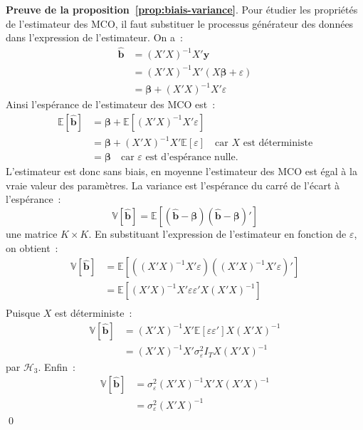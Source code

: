 \documentclass[10pt]{beamer}
\begin{document}
\begin{notes}

  \textbf{Preuve de la proposition~\ref{prop:biais-variance}}. Pour étudier les propriétés de l'estimateur des MCO, il faut substituer le processus générateur des données dans l'expression de l'estimateur. On a~:
  \[
    \begin{split}
      \hat{\mathbf b} &= (X'X)^{-1}X'\mathbf y\\
                      &= (X'X)^{-1}X'\left( X\bm \beta + \varepsilon \right)\\
                      &= \bm \beta + (X'X)^{-1}X'\varepsilon
    \end{split}
  \]
  Ainsi l'espérance de l'estimateur des MCO est~:
  \[
    \begin{split}
      \mathbb E \left[ \hat{\mathbf b} \right] &= \bm \beta + \mathbb E\left[ (X'X)^{-1}X'\varepsilon \right]\\
                                               &= \bm \beta + (X'X)^{-1}X'\mathbb E\left[ \varepsilon \right]\quad\text{car $X$ est déterministe}\\
                                               &= \bm \beta\quad\text{car $\varepsilon$  est d'espérance nulle.}
    \end{split}
  \]
  L'estimateur est donc sans biais, en moyenne l'estimateur des MCO est égal à la vraie valeur des paramètres. La variance est l'espérance du carré de l'écart à l'espérance~:
  \[
    \mathbb V\left[ \hat{\mathbf b} \right] = \mathbb E\left[\left( \hat{\mathbf b}- \bm\beta \right)\left( \hat{\mathbf b}- \bm\beta \right)'\right]
  \]
  une matrice $K\times K$. En substituant l'expression de l'estimateur en fonction de $\varepsilon$, on obtient~:
\[
    \begin{split}
      \mathbb V\left[ \hat{\mathbf b} \right] &= \mathbb E\left[ \left( (X'X)^{-1}X'\varepsilon \right)\left( (X'X)^{-1}X'\varepsilon \right)' \right]\\
                                              &= \mathbb E\left[ (X'X)^{-1}X'\varepsilon\varepsilon' X (X'X)^{-1} \right]\\
    \end{split}
  \]
Puisque $X$ est déterministe~:
  \[
    \begin{split}
      \mathbb V\left[ \hat{\mathbf b} \right]
                                              &= (X'X)^{-1}X' \mathbb E\left[ \varepsilon\varepsilon' \right]X(X'X)^{-1}\\
                                              &= (X'X)^{-1}X' \sigma_\varepsilon^2I_T X(X'X)^{-1}
    \end{split}
  \]
  par $\mathcal H_3$. Enfin~:
\[
    \begin{split}
      \mathbb V\left[ \hat{\mathbf b} \right]
                                              &= \sigma_\varepsilon^2(X'X)^{-1}X'X(X'X)^{-1}\\
      &= \sigma_\varepsilon^2(X'X)^{-1}
    \end{split}
  \]
  \qed



\end{notes}
\end{document}
